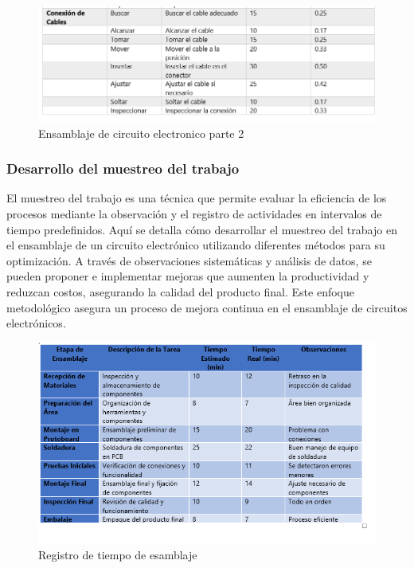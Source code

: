     
    \begin{figure}[H]
        \centering
        \includegraphics[scale=0.30]{1/img/Ensamblaje de circuito electronico parte 2.png}
        \caption{Ensamblaje de circuito electronico parte 2}
    \end{figure}
    \subsubsection{Desarrollo del muestreo del trabajo}
    El muestreo del trabajo es una técnica que permite evaluar la eficiencia de los procesos mediante la observación y el registro de actividades en intervalos de tiempo predefinidos. Aquí se detalla cómo desarrollar el muestreo del trabajo en el ensamblaje de un circuito electrónico utilizando diferentes métodos para su optimización.
    A través de observaciones sistemáticas y análisis de datos, se pueden proponer e implementar mejoras que aumenten la productividad y reduzcan costos, asegurando la calidad del producto final. Este enfoque metodológico asegura un proceso de mejora continua en el ensamblaje de circuitos electrónicos.\cite{Niebel}
    \begin{figure}[H]
        \centering
        \includegraphics[scale=0.50]{1/img/Registro de tiempo de esamblaje.png}
        \caption{Registro de tiempo de esamblaje}
    \end{figure}
